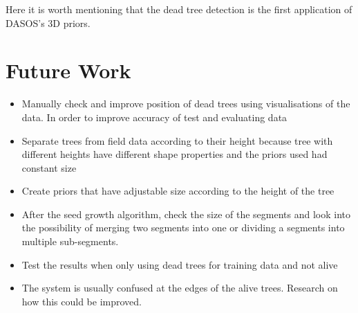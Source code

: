 \documentclass{subfiles}
\begin{document}
\par Here it is worth mentioning that the dead tree detection is the first application of DASOS's 3D priors. 

\section{Future Work}

\begin{itemize}
	\item Manually check and improve position of dead trees using visualisations of the data. In order to improve accuracy of test and evaluating data
	\item Separate trees from field data according to their height because tree with different heights have different shape properties and the priors used had constant size
	\item Create priors that have adjustable size according to the height of the tree	
	\item After the seed growth algorithm, check the size of the segments and look into the possibility of merging two segments into one or dividing a segments into multiple sub-segments.
	\item Test the results when only using dead trees for training data and not alive
	\item The system is usually confused at the edges of the alive trees. Research on how this could be improved. 
\end{itemize}
\end{document}
